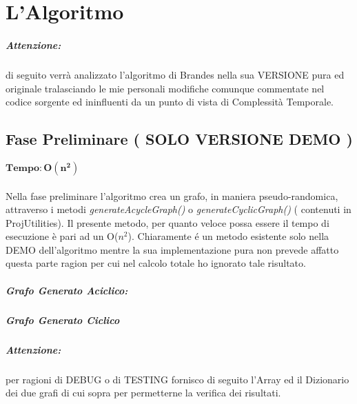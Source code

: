 \chapter{L'Algoritmo}
\paragraph{Attenzione:} di seguito verrà analizzato l'algoritmo di Brandes nella sua VERSIONE pura ed originale tralasciando le mie personali modifiche comunque commentate nel codice sorgente ed ininfluenti da un punto di vista di Complessità Temporale.

\section{Fase Preliminare ( SOLO VERSIONE DEMO )}
$\mathbf{Tempo: O(n^2)}$\\ 	\\
Nella fase preliminare l'algoritmo crea un grafo, in maniera pseudo-randomica, attraverso i metodi \emph{generateAcycleGraph()} o  \emph{generateCyclicGraph()} ( contenuti in ProjUtilities).
Il presente metodo, per quanto veloce possa essere il tempo di esecuzione è pari ad un O($n^2$). Chiaramente \'e un metodo esistente solo nella DEMO dell'algoritmo mentre la sua implementazione pura non prevede affatto questa parte ragion per cui nel calcolo totale ho ignorato tale risultato.
\newline
\newline

\paragraph{Grafo Generato Aciclico:}


\paragraph{\newline Grafo Generato Ciclico \newline}


\paragraph{Attenzione:} per ragioni di DEBUG o di TESTING fornisco di seguito l'Array ed il Dizionario dei due grafi di cui sopra per permetterne la verifica dei risultati. \newline \newline

